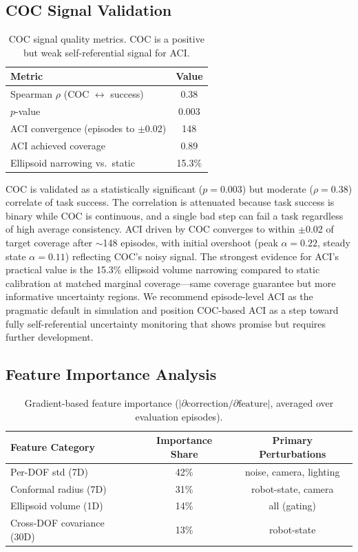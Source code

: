 \documentclass[letterpaper]{article}
\begin{document}
\subsection{COC Signal Validation}
\label{sec:coc}

\begin{table}[h]
\centering
\caption{COC signal quality metrics. COC is a positive but weak self-referential signal for ACI.}
\label{tab:coc}
\begin{tabular}{lc}
\toprule
Metric & Value \\
\midrule
Spearman $\rho$ (COC $\leftrightarrow$ success) & 0.38 \\
$p$-value & 0.003 \\
ACI convergence (episodes to $\pm$0.02) & 148 \\
ACI achieved coverage & 0.89 \\
Ellipsoid narrowing vs.\ static & 15.3\% \\
\bottomrule
\end{tabular}
\end{table}

COC is validated as a statistically significant ($p{=}0.003$) but moderate ($\rho{=}0.38$) correlate of task success.
The correlation is attenuated because task success is binary while COC is continuous, and a single bad step can fail a task regardless of high average consistency.
ACI driven by COC converges to within $\pm$0.02 of target coverage after $\sim$148 episodes, with initial overshoot (peak $\alpha{=}0.22$, steady state $\alpha{=}0.11$) reflecting COC's noisy signal.
The strongest evidence for ACI's practical value is the 15.3\% ellipsoid volume narrowing compared to static calibration at matched marginal coverage---same coverage guarantee but more informative uncertainty regions.
We recommend episode-level ACI as the pragmatic default in simulation and position COC-based ACI as a step toward fully self-referential uncertainty monitoring that shows promise but requires further development.

\subsection{Feature Importance Analysis}
\label{sec:feature_importance}

\begin{table}[h]
\centering
\caption{Gradient-based feature importance ($|\partial \text{correction} / \partial \text{feature}|$, averaged over evaluation episodes).}
\label{tab:feature_importance}
\begin{tabular}{lcc}
\toprule
Feature Category & Importance Share & Primary Perturbations \\
\midrule
Per-DOF std (7D) & 42\% & noise, camera, lighting \\
Conformal radius (7D) & 31\% & robot-state, camera \\
Ellipsoid volume (1D) & 14\% & all (gating) \\
Cross-DOF covariance (30D) & 13\% & robot-state \\
\bottomrule
\end{tabular}
\end{table}
\end{document}
